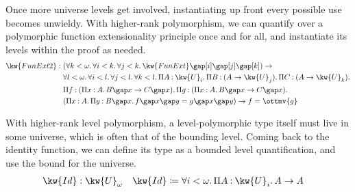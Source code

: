 \documentclass[a4paper,UKenglish,cleveref,autoref,thm-restate]{lipics-v2021}
\begin{document}
Once more universe levels get involved,
instantiating up front every possible use becomes unwieldy.
With higher-rank polymorphism,
we can quantify over a polymorphic function extensionality principle once and for all,
and instantiate its levels within the proof as needed.
%
\begin{align*}
   \kw{ FunExt2 }  &:   (     \forall  k  <   \omega   \mathpunct{.}   \forall  i  <  k  \mathpunct{.}   \forall  j  <  k  \mathpunct{.}   \kw{ FunExt }      \gap [  i  ]   \gap [  j  ]   \gap [  k  ]  )   \to   \relax   \\
  &\phantom{{} : {}}  \forall  l  <   \omega   \mathpunct{.}   \forall  i  <  l  \mathpunct{.}   \forall  j  <  l  \mathpunct{.}   \forall  k  <  l  \mathpunct{.}   \Pi  A  \mathbin{:}   \kw{U}_{ i }   \mathpunct{.}   \Pi  B  \mathbin{:}   (  A  \to   \kw{U}_{ j }   )   \mathpunct{.}   \Pi  C  \mathbin{:}   (  A  \to   \kw{U}_{ k }   )   \mathpunct{.}   \relax         \\
  &\phantom{{} : {}}  \Pi  f  \mathbin{:}   (     \Pi  x  \mathbin{:}  A  \mathpunct{.}  B   \gap  x   \to  C   \gap  x  )   \mathpunct{.}   \Pi  g  \mathbin{:}   (     \Pi  x  \mathbin{:}  A  \mathpunct{.}  B   \gap  x   \to  C   \gap  x  )   \mathpunct{.}   \relax    \\
  &\phantom{{} : {}}   (       \Pi  x  \mathbin{:}  A  \mathpunct{.}   \Pi  y  \mathbin{:}   B  \gap  x   \mathpunct{.}  f    \gap  x   \gap  y   =  g   \gap  x   \gap  y  )   \to    f  =  \ottmv{g}   
\end{align*}

With higher-rank level polymorphism,
a level-polymorphic type itself must live in some universe,
which is often that of the bounding level.
Coming back to the identity function,
we can define its type as a bounded level quantification,
and use the bound for the universe.
%
\begin{align*}
   \kw{ Id }  &:  \kw{U}_{  \omega  }  &  \kw{ Id }  &\coloneqq   \forall  i  <   \omega   \mathpunct{.}   \Pi  A  \mathbin{:}   \kw{U}_{ i }   \mathpunct{.}  A    \to  A 
\end{align*}
\end{document}
